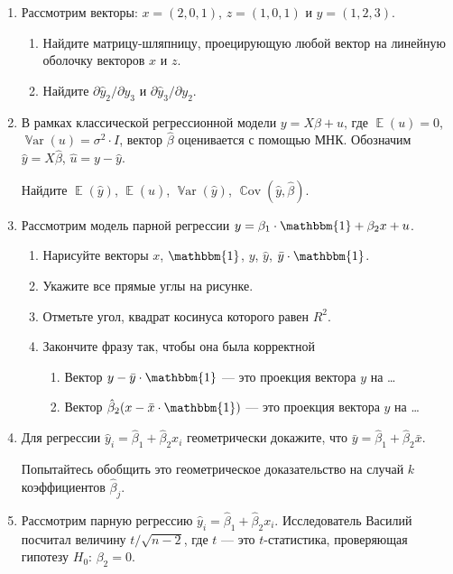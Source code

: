 \documentclass[12pt, a4paper]{article}
\DeclareMathOperator{\E}{\mathbb{E}}
\DeclareMathOperator{\Var}{\mathbb{V}ar}
\DeclareMathOperator{\Cov}{\mathbb{C}ov}
\def \hb{\hat{\beta}}
\def \1{\mathbbm{1}}
\def \hy{\hat{y}}
\begin{document}
\begin{enumerate}

\item Рассмотрим векторы: $x = (2, 0, 1)$, $z = (1, 0, 1)$ и $y= (1, 2, 3)$.
\begin{enumerate}
  \item Найдите матрицу-шляпницу, проецирующую любой вектор на линейную оболочку векторов $x$ и $z$.
  \item Найдите $\partial \hat y_2 / \partial y_3$ и $\partial \hat y_3/ \partial y_2$.
\end{enumerate}



\item В рамках классической регрессионной модели $y=X\beta + u$, где $\E(u)=0$, $\Var(u)=\sigma^2 \cdot I$, вектор $\hb$ оценивается с помощью МНК. Обозначим $\hy=X\hb$, $\hat{u}=y-\hy$.

Найдите $\E(\hy)$, $\E(\hat{u})$, $\Var(\hy)$, $\Cov(\hy, \hb)$.

\item Рассмотрим модель парной регрессии $y = \beta_1 \cdot \1 + \beta_2 x + u$.

\begin{enumerate}
  \item Нарисуйте векторы $x$, $\1$, $y$, $\hy$, $\bar y \cdot \1$.
  \item Укажите все прямые углы на рисунке.
  \item Отметьте угол, квадрат косинуса которого равен $R^2$.
  \item Закончите фразу так, чтобы она была корректной
  \begin{enumerate}
    \item Вектор $y - \bar{y}\cdot \1$ — это проекция вектора $y$ на \ldots
    \item Вектор $\hb_2 (x - \bar x\cdot \1)$ — это проекция вектора $y$ на \ldots
  \end{enumerate}
\end{enumerate}

\item Для регрессии $\hat y_i = \hb_1 + \hb_2 x_i$ геометрически докажите, что $\bar y = \hb_1 + \hb_2 \bar x$.

Попытайтесь обобщить это геометрическое доказательство на случай $k$ коэффициентов $\hb_j$.

\item Рассмотрим парную регрессию $\hat y_i = \hb_1 + \hb_2 x_i$. Исследователь Василий посчитал величину $t/\sqrt{n-2}$, где $t$ — это $t$-статистика, проверяющая гипотезу $H_0$: $\beta_2 = 0$.


\end{enumerate}
\end{document}
